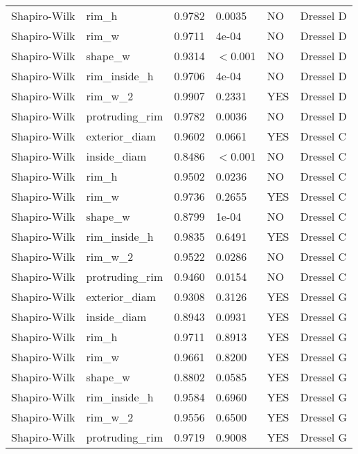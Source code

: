 \begin{table}[ht]
\begin{tabular}{llllll}
  Shapiro-Wilk &     rim\_h      &    0.9782 &  0.0035   &    NO     & Dressel D \\ 
  Shapiro-Wilk &     rim\_w      &    0.9711 &   4e-04   &    NO     & Dressel D \\ 
  Shapiro-Wilk &    shape\_w     &    0.9314 &  $<$0.001   &    NO     & Dressel D \\ 
  Shapiro-Wilk &  rim\_inside\_h  &    0.9706 &   4e-04   &    NO     & Dressel D \\ 
  Shapiro-Wilk &    rim\_w\_2     &    0.9907 &  0.2331   &    YES    & Dressel D \\ 
  Shapiro-Wilk & protruding\_rim &    0.9782 &  0.0036   &    NO     & Dressel D \\ 
  Shapiro-Wilk & exterior\_diam  &    0.9602 &  0.0661   &    YES    & Dressel C \\ 
  Shapiro-Wilk &  inside\_diam   &    0.8486 &  $<$0.001   &    NO     & Dressel C \\ 
  Shapiro-Wilk &     rim\_h      &    0.9502 &  0.0236   &    NO     & Dressel C \\ 
  Shapiro-Wilk &     rim\_w      &    0.9736 &  0.2655   &    YES    & Dressel C \\ 
  Shapiro-Wilk &    shape\_w     &    0.8799 &   1e-04   &    NO     & Dressel C \\ 
  Shapiro-Wilk &  rim\_inside\_h  &    0.9835 &  0.6491   &    YES    & Dressel C \\ 
  Shapiro-Wilk &    rim\_w\_2     &    0.9522 &  0.0286   &    NO     & Dressel C \\ 
  Shapiro-Wilk & protruding\_rim &    0.9460 &  0.0154   &    NO     & Dressel C \\ 
  Shapiro-Wilk & exterior\_diam  &    0.9308 &    0.3126 &    YES    & Dressel G \\ 
  Shapiro-Wilk &  inside\_diam   &    0.8943 &    0.0931 &    YES    & Dressel G \\ 
  Shapiro-Wilk &     rim\_h      &    0.9711 &    0.8913 &    YES    & Dressel G \\ 
  Shapiro-Wilk &     rim\_w      &    0.9661 &    0.8200 &    YES    & Dressel G \\ 
  Shapiro-Wilk &    shape\_w     &    0.8802 &    0.0585 &    YES    & Dressel G \\ 
  Shapiro-Wilk &  rim\_inside\_h  &    0.9584 &    0.6960 &    YES    & Dressel G \\ 
  Shapiro-Wilk &    rim\_w\_2     &    0.9556 &    0.6500 &    YES    & Dressel G \\ 
  Shapiro-Wilk & protruding\_rim &    0.9719 &    0.9008 &    YES    & Dressel G \\ 
   \hline
\end{tabular}
\end{table}
